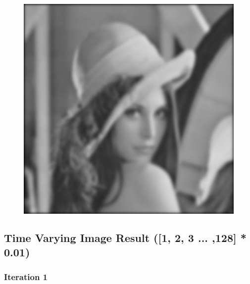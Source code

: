 \documentclass[11pt]{article}
\makeatletter
\def\maxwidth{\ifdim\Gin@nat@width>\linewidth\linewidth
    \else\Gin@nat@width\fi}
\let\Oldincludegraphics\includegraphics
\renewcommand{\includegraphics}[1]{\Oldincludegraphics[width=.8\maxwidth]{#1}}
\makeatother
\begin{document}
\begin{figure}[!htbp]
	\centering
	\includegraphics{"127th iterations_const"}
	\label{fig:127th-iterationsconst}
\end{figure}
\clearpage
    \hypertarget{time-varying-image-result}{%
\subsection{Time Varying Image Result ([1, 2, 3 ... ,128] * 0.01)}\label{time-varying-image-result}}

    \hypertarget{iteration-1}{%
\subsubsection{Iteration 1}\label{iteration-1}}
\end{document}
